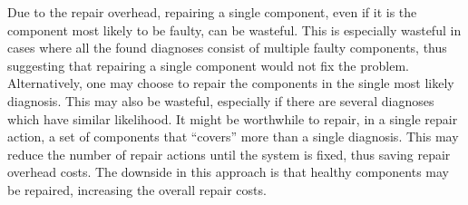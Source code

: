 \documentclass[review]{elsarticle}
\begin{document}
Due to the repair overhead, repairing a single component, even if it is the component most likely to be faulty, can be wasteful. This is especially wasteful in cases where all the found diagnoses consist of multiple faulty components, thus suggesting that repairing a single component would not fix the problem. Alternatively, one may choose to repair the components in the single most likely diagnosis. This may also be wasteful, especially if there are several diagnoses which have similar likelihood. It might be worthwhile to repair, in a single repair action, a set of components that ``covers'' more than a single diagnosis. This may reduce the number of repair actions until the system is fixed, thus saving repair overhead costs. The downside in this approach is that healthy components may be repaired, increasing the overall repair costs.

\end{document}
